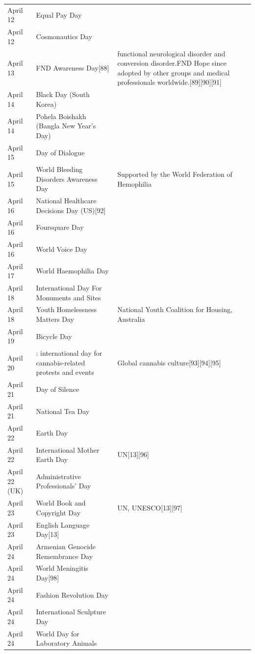 \documentclass[
]{book}
\begin{document}
\begin{longtable}[t]{>{\raggedright\arraybackslash}p{8em}>{\raggedright\arraybackslash}p{20em}>{\raggedright\arraybackslash}p{12em}}
April 12 & Equal Pay Day & \\
April 12 & Cosmonautics Day & \\
\addlinespace
April 13 & FND Awareness Day[88] & functional neurological disorder and conversion disorder.FND Hope since adopted by other groups and medical professionals worldwide.[89][90][91]\\
April 14 & Black Day (South Korea) & \\
April 14 & Pohela Boishakh (Bangla New Year's Day) & \\
April 15 & Day of Dialogue & \\
April 15 & World Bleeding Disorders Awareness Day & Supported by the World Federation of Hemophilia\\
\addlinespace
April 16 & National Healthcare Decisions Day (US)[92] & \\
April 16 & Foursquare Day & \\
April 16 & World Voice Day & \\
April 17 & World Haemophilia Day & \\
April 18 & International Day For Monuments and Sites & \\
\addlinespace
April 18 & Youth Homelessness Matters Day & National Youth Coalition for Housing, Australia\\
April 19 & Bicycle Day & \\
April 20 & 420: international day for cannabis-related protests and events & Global cannabis culture[93][94][95]\\
April 21 & Day of Silence & \\
April 21 & National Tea Day & \\
\addlinespace
April 22 & Earth Day & \\
April 22 & International Mother Earth Day & UN[13][96]\\
April 22 (UK) & Administrative Professionals' Day & \\
April 23 & World Book and Copyright Day & UN, UNESCO[13][97]\\
April 23 & English Language Day[13] & \\
\addlinespace
April 24 & Armenian Genocide Remembrance Day & \\
April 24 & World Meningitis Day[98] & \\
April 24 & Fashion Revolution Day & \\
April 24 & International Sculpture Day & \\
April 24 & World Day for Laboratory Animals & \\

\end{longtable}
\end{document}
